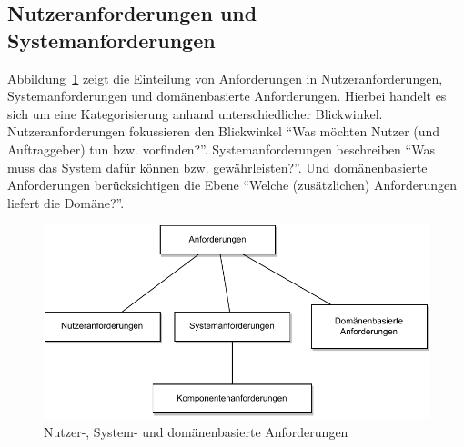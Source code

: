 \subsection{Nutzeranforderungen und Systemanforderungen}
\label{sec:Kap-6.2.1}

Abbildung~\ref{fig:nutzer-vs-system} zeigt die Einteilung von Anforderungen in Nutzeranforderungen, System\-anforderungen und domänenbasierte Anforderungen. Hierbei handelt es sich um eine Kategorisierung anhand unterschiedlicher Blickwinkel. Nutzeranforderungen fokussieren den Blickwinkel "`Was möchten Nutzer (und Auftraggeber) tun bzw. vorfinden?"'. Systemanforderungen beschreiben "`Was muss das System dafür können bzw. gewährleisten?"'. Und domänenbasierte Anforderungen berücksichtigen die Ebene "`Welche (zusätzlichen) Anforderungen liefert die Domäne?"'.

\vspace{\baselineskip} %
\vspace{\baselineskip} %

\begin{figure}[h!]
	\centering
	\includegraphics{Bilder/Kapitel-6/nutzer_vs_system.pdf}
	\caption{Nutzer-, System- und domänenbasierte Anforderungen}
	\label{fig:nutzer-vs-system}
\end{figure}

\vspace{\baselineskip} %


